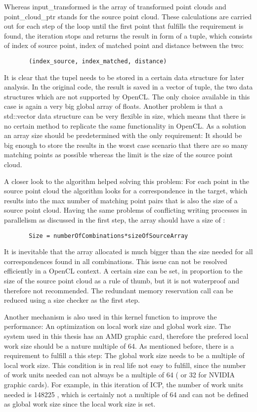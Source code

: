 Whereas input\_transformed is the array of transformed point clouds and point\_cloud\_ptr stands for the source point cloud. These calculations are carried out for each step of the loop until the first point that fulfills the requirement is found, the iteration stops and returns the result in form of a tuple, which consists of index of source point, index of matched point and distance between the two:
\begin{lstlisting}
       (index_source, index_matched, distance)
\end{lstlisting}  

It is clear that the tupel needs to be stored in a certain data structure for later analysis. In the original code, the result is saved in a vector of tuple, the two data structures which are not supported by OpenCL. The only choice available in this case is again a very big global array of floats. Another problem is that a std::vector data structure can be very flexible in size, which means that there is no certain method to replicate the same functionality in OpenCL. As a solution an array size should be predetermined with the only requirement: It should be big enough to store the results in the worst case scenario that there are so many matching points as possible whereas the limit is the size of the source point cloud.

A closer look to the algorithm helped solving this problem: For each point in the source point cloud the algorithm looks for a correspondence in the target, which results into the max number of matching point pairs that is also the size of a source point cloud. Having the same problems of conflicting writing processes in parallelism as discussed in the first step, the array should have a size of :

\begin{lstlisting}
       Size = numberOfCombinations*sizeOfSourceArray
\end{lstlisting}

It is inevitable that the array allocated is much bigger than the size needed for all correspondences found in all combinations. This issue can not be resolved efficiently in a OpenCL context. A certain size can be set, in proportion to the size of  the source point cloud as a rule of thumb, but it is not waterproof and therefore not recommended. The redundant memory reservation call can be reduced using a size checker as the first step.

Another mechanism is also used in this kernel function to improve the performance: An optimization on local work size and global work size. The system used in this thesis has an AMD graphic card, therefore the prefered local work size should be a nature multiple of 64. As mentioned before, there is a requirement to fulfill a this step: The global work size needs to be a multiple of local work size. This condition is in real life not easy to fulfill, since the number of work units needed can not always be a multiple of 64 ( or 32 for NVIDIA graphic cards). For example, in this iteration of ICP, the number of work units needed is 148225 , which is certainly not a multiple of 64 and can not be defined as global work size since the local work size is set.

